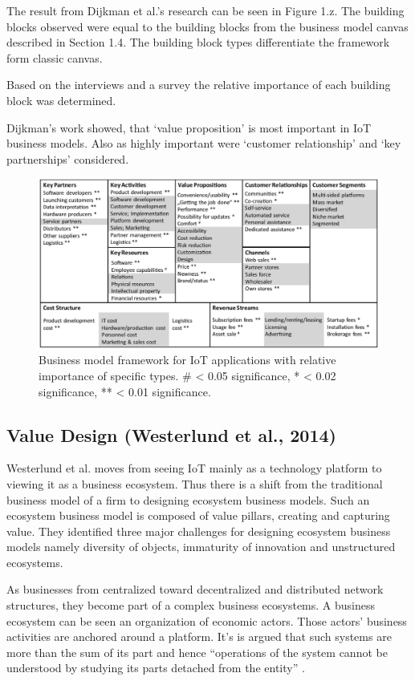 		The result from Dijkman et al.'s research can be seen in Figure 1.z. The building blocks observed were equal to the building blocks from the business model canvas described in Section 1.4. The building block types differentiate the framework form classic canvas.

		Based on the interviews and a survey the relative importance of each building block was determined. 

		Dijkman's work showed, that `value proposition' is most important in IoT business models. Also as highly important were `customer relationship' and `key  partnerships' considered. 
		\begin{figure}[h]
			\begin{center}
		    \includegraphics[scale=0.52]{Talk11/iot_canvas_rel_imp_dijkman.jpg}
		    \end{center}
		    \caption{Business model framework for IoT applications with relative importance of specific types. \# < 0.05 significance, * < 0.02 significance, **  < 0.01 significance.}
		    \label{Business model for IoT}
		\end{figure}

	\subsection{Value Design (Westerlund et al., 2014)}
		Westerlund et al. moves from seeing IoT mainly as a technology platform to viewing it as a business ecosystem. Thus there is a shift from the traditional business model of a firm to designing ecosystem business models. Such an ecosystem business model is composed of value pillars, creating and capturing value. They identified three major challenges for designing ecosystem business models namely diversity of objects, immaturity of innovation and unstructured ecosystems.

		As businesses from centralized toward decentralized and distributed network structures, they become part of a complex business ecosystems. A business ecosystem can be seen an organization of economic actors. Those actors' business activities are anchored around a platform. It's is argued that such systems are more than the sum of its part and hence ``operations of the system cannot be understood by studying its parts detached from the entity'' \cite{westerlund}.

